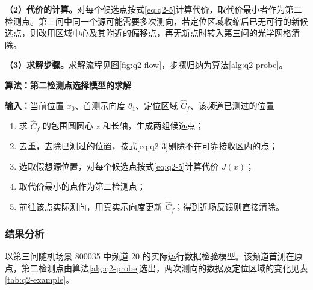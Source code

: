 \textbf{（2）代价的计算。}对每个候选点按式\eqref{eq:q2-5}计算代价，取代价最小者作为第二检测点。第三问中同一个源可能需要多次测向，若定位区域收缩后已无可行的新候选点，则改用区域中心及其附近的偏移点，再无新点时转入第三问的光学网格清除。

\textbf{（3）求解步骤。}求解流程见图\ref{fig:q2-flow}，步骤归纳为算法\ref{alg:q2-probe}。

\begin{center}
\begin{minipage}{\linewidth}
\centering
\QTwoFlowFigure
{}
\label{fig:q2-flow}
\end{minipage}
\end{center}

\par\medskip
\noindent\begin{minipage}{\linewidth}
\small
{}\label{alg:q2-probe}
\textbf{算法\thealgorithm：第二检测点选择模型的求解}\par\smallskip
\noindent\textbf{输入：}当前位置 $x_0$、首测示向度 $\theta_1$、定位区域 $\widehat C_f$、该频道已测过的位置
\begin{enumerate}
\setlength{\itemsep}{2pt}
\setlength{\parskip}{0pt}
\item 求 $\widehat C_f$ 的包围圆圆心 $z$ 和长轴，生成两组候选点；
\item 去重，去除已测过的位置，按式\eqref{eq:q2-3}剔除不在可靠接收区内的点；
\item 选取假想源位置，对每个候选点按式\eqref{eq:q2-5}计算代价 $J(x)$；
\item 取代价最小的点作为第二检测点；
\item 前往该点实际测向，用真实示向度更新 $\widehat C_f$；得到近场反馈则直接清除。
\end{enumerate}
\end{minipage}
\par\medskip

\subsubsection{结果分析}\label{sec:q2-4}

以第三问随机场景 800035 中频道 $20$ 的实际运行数据检验模型。该频道首测在原点，第二检测点由算法\ref{alg:q2-probe}选出，两次测向的数据及定位区域的变化见表\ref{tab:q2-example}。

